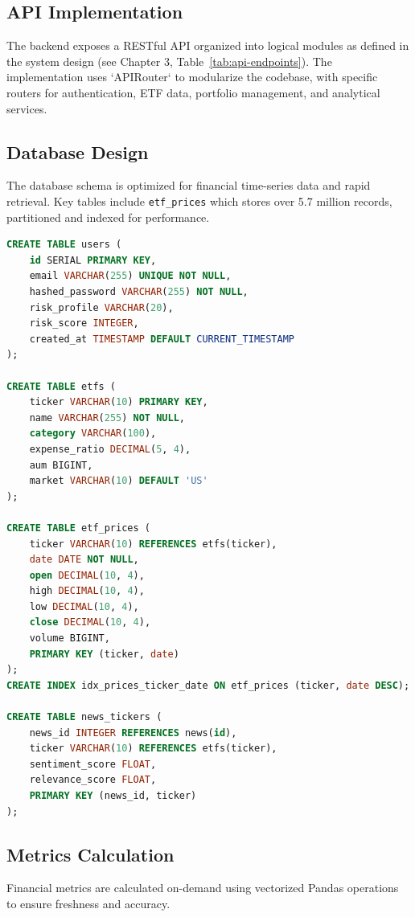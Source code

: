 \subsection{API Implementation}

The backend exposes a RESTful API organized into logical modules as defined in the system design (see Chapter 3, Table~\ref{tab:api-endpoints}). The implementation uses `APIRouter` to modularize the codebase, with specific routers for authentication, ETF data, portfolio management, and analytical services.

\subsection{Database Design}

The database schema is optimized for financial time-series data and rapid retrieval. Key tables include \texttt{etf\_prices} which stores over 5.7 million records, partitioned and indexed for performance.

\begin{lstlisting}[language=SQL, caption={Core Tables Schema}]
CREATE TABLE users (
    id SERIAL PRIMARY KEY,
    email VARCHAR(255) UNIQUE NOT NULL,
    hashed_password VARCHAR(255) NOT NULL,
    risk_profile VARCHAR(20),
    risk_score INTEGER,
    created_at TIMESTAMP DEFAULT CURRENT_TIMESTAMP
);

CREATE TABLE etfs (
    ticker VARCHAR(10) PRIMARY KEY,
    name VARCHAR(255) NOT NULL,
    category VARCHAR(100),
    expense_ratio DECIMAL(5, 4),
    aum BIGINT,
    market VARCHAR(10) DEFAULT 'US'
);

CREATE TABLE etf_prices (
    ticker VARCHAR(10) REFERENCES etfs(ticker),
    date DATE NOT NULL,
    open DECIMAL(10, 4),
    high DECIMAL(10, 4),
    low DECIMAL(10, 4),
    close DECIMAL(10, 4),
    volume BIGINT,
    PRIMARY KEY (ticker, date)
);
CREATE INDEX idx_prices_ticker_date ON etf_prices (ticker, date DESC);

CREATE TABLE news_tickers (
    news_id INTEGER REFERENCES news(id),
    ticker VARCHAR(10) REFERENCES etfs(ticker),
    sentiment_score FLOAT,
    relevance_score FLOAT,
    PRIMARY KEY (news_id, ticker)
);
\end{lstlisting}

\subsection{Metrics Calculation}

Financial metrics are calculated on-demand using vectorized Pandas operations to ensure freshness and accuracy.

